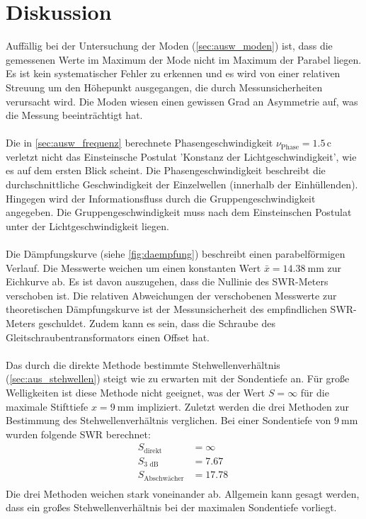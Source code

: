 \section{Diskussion}
\label{sec:Diskussion}
Auffällig bei der Untersuchung der Moden (\autoref{sec:ausw_moden}) ist, dass die gemessenen Werte im Maximum der Mode nicht im Maximum der Parabel liegen.
Es ist kein systematischer Fehler zu erkennen und es wird von einer relativen Streuung um den Höhepunkt ausgegangen, die durch Messunsicherheiten verursacht wird.
Die Moden wiesen einen gewissen Grad an Asymmetrie auf, was die Messung beeinträchtigt hat.
\\
\\
Die in \autoref{sec:ausw_frequenz} berechnete Phasengeschwindigkeit $\nu_\text{Phase} = 1.5 \, \mathrm{c}$ verletzt nicht das Einsteinsche Postulat 'Konstanz der Lichtgeschwindigkeit', wie es auf dem ersten Blick scheint.
Die Phasengeschwindigkeit beschreibt die durchschnittliche Geschwindigkeit der Einzelwellen (innerhalb der Einhüllenden).
Hingegen wird der Informationsfluss durch die Gruppengeschwindigkeit angegeben.
Die Gruppengeschwindigkeit muss nach dem Einsteinschen Postulat unter der Lichtgeschwindigkeit liegen.
\\
\\
Die Dämpfungskurve (siehe \autoref{fig:daempfung}) beschreibt einen parabelförmigen Verlauf.
Die Messwerte weichen um einen konstanten Wert $\bar{x} = \SI{14.38}{\milli\metre}$ zur Eichkurve ab.
Es ist davon auszugehen, dass die Nullinie des SWR-Meters verschoben ist.
Die relativen Abweichungen der verschobenen Messwerte zur theoretischen Dämpfungskurve ist der Messunsicherheit des empfindlichen SWR-Meters geschuldet.
Zudem kann es sein, dass die Schraube des Gleitschraubentransformators einen Offset hat.
\\
\\
Das durch die direkte Methode bestimmte Stehwellenverhältnis (\autoref{sec:aus_stehwellen}) steigt wie zu erwarten mit der Sondentiefe an.
Für große Welligkeiten ist diese Methode nicht geeignet, was der Wert $S = \infty$ für die maximale Stifttiefe $x = \SI{9}{\milli\metre}$ impliziert.
Zuletzt werden die drei Methoden zur Bestimmung des Stehwellenverhältnis verglichen.
Bei einer Sondentiefe von $\SI{9}{\milli\metre}$ wurden folgende SWR berechnet:
\begin{align*}
    S_\text{direkt} &= \infty \\
    S_\text{3 dB} &= \SI{7.67}{} \\
    S_\text{Abschwächer} &= \SI{17.78}{} \\
\end{align*}
Die drei Methoden weichen stark voneinander ab.
Allgemein kann gesagt werden, dass ein großes Stehwellenverhältnis bei der maximalen Sondentiefe vorliegt.